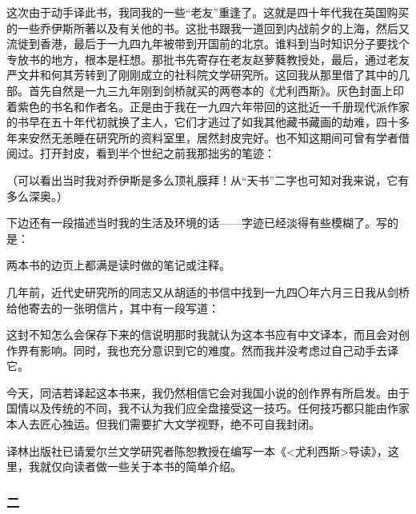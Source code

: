 \par 这次由于动手译此书，我同我的一些“老友”重逢了。这就是四十年代我在英国购买的一些乔伊斯所著以及有关他的书。这批书跟我一道回到内战前夕的上海，然后又流徙到香港，最后于一九四九年被带到开国前的北京。谁料到当时知识分子要找个专放书的地方，根本是枉想。那批书先寄存在老友赵萝蕤教授处，最后，通过老友严文井和何其芳转到了刚刚成立的社科院文学研究所。这回我从那里借了其中的几部。首先自然是一九三九年刚到剑桥就买的两卷本的《尤利西斯》。灰色封面上印着紫色的书名和作者名。正是由于我在一九四六年带回的这批近一千册现代派作家的书早在五十年代初就换了主人，它们才逃过了如我其他藏书藏画的劫难，四十多年来安然无恙睡在研究所的资料室里，居然封皮完好。也不知这期间可曾有学者借阅过。打开封皮，看到半个世纪之前我那拙劣的笔迹：
\par （可以看出当时我对乔伊斯是多么顶礼膜拜！从“天书”二字也可知对我来说，它有多么深奥。）
\par 下边还有一段描述当时我的生活及环境的话——字迹已经淡得有些模糊了。写的是：
\par 两本书的边页上都满是读时做的笔记或注释。
\par 几年前，近代史研究所的同志又从胡适的书信中找到一九四〇年六月三日我从剑桥给他寄去的一张明信片，其中有一段写道：
\par 这封不知怎么会保存下来的信说明那时我就认为这本书应有中文译本，而且会对创作界有影响。同时，我也充分意识到它的难度。然而我并没考虑过自己动手去译它。
\par 今天，同洁若译起这本书来，我仍然相信它会对我国小说的创作界有所启发。由于国情以及传统的不同，我不认为我们应全盘接受这一技巧。任何技巧都只能由作家本人去匠心独运。但我们需要扩大文学视野，绝不可自我封闭。
\par 译林出版社已请爱尔兰文学研究者陈恕教授在编写一本《<尤利西斯>导读》，这里，我就仅向读者做一些关于本书的简单介绍。


\subsubsection*{二}

